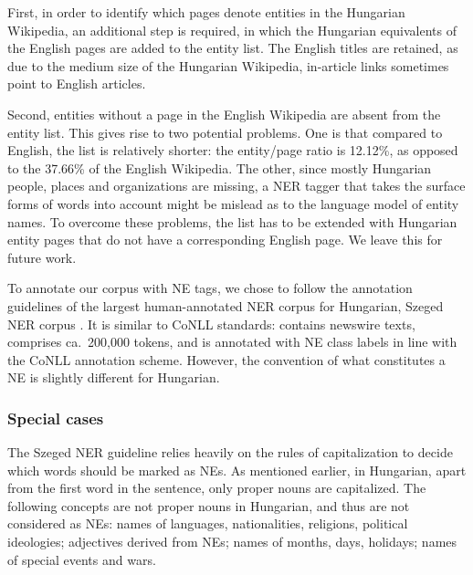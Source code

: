 \documentclass[11pt]{article}
\begin{document}
First, in order to identify which pages denote entities in the Hungarian Wikipedia, an additional step is required, in which the Hungarian equivalents of the English pages are added to the entity list. The English titles are retained, as due to the medium size of the Hungarian Wikipedia, in-article links sometimes point to English articles.

Second, entities without a page in the English Wikipedia are absent from the entity list. This gives rise to two potential problems. One is that compared to English, the list is relatively shorter: the entity/page ratio is 12.12\%, as opposed to the 37.66\% of the English Wikipedia. The other, since mostly Hungarian people, places and organizations are missing, a NER tagger that takes the surface forms of words into account might be mislead as to the language model of entity names. To overcome these problems, the list has to be extended with Hungarian entity pages that do not have a corresponding English page. We leave this for future work.

To annotate our corpus with NE tags, we chose to follow the annotation guidelines of the largest human-annotated NER corpus for Hungarian, Szeged NER corpus \cite{Szarvas:06}. It is similar to CoNLL standards: contains newswire texts, comprises ca.~200,000 tokens, and is annotated with NE class labels in line with the CoNLL annotation scheme. However, the convention of what constitutes a NE is slightly different for Hungarian. 

\subsubsection{Special cases}

The Szeged NER guideline relies heavily on the rules of capitalization to decide which words should be marked as NEs. As mentioned earlier, in Hungarian, apart from the first word in the sentence, only proper nouns are capitalized. The following concepts are not proper nouns in Hungarian, and thus are not considered as NEs: names of languages, nationalities, religions, political ideologies; adjectives derived from NEs; names of months, days, holidays; names of special events and wars.

\end{document}
